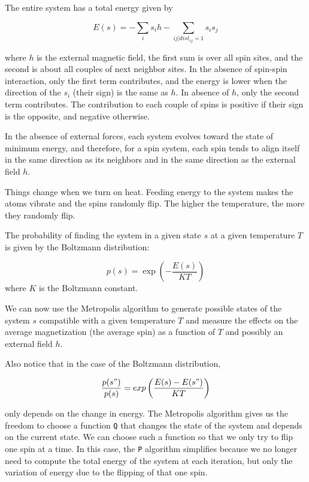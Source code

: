 \documentclass[justified, sixbynine]{tufte-book}
\def\ft{\small\tt}
\theoremstyle{plain}%
\newtheorem * {corollary}{Corollary}
\theoremstyle{definition}
\theoremstyle{remark}
\newtheorem * {remark}{Remark}
\newtheorem * {note}{Note}
\begin{document}
\begin{fullwidth}
The entire system has a total energy given by

\begin{equation}
E(s) = - \sum_i s_i h - \sum_{ij|dist_{ij}=1} s_i s_j
\end{equation}

where $h$ is the external magnetic field, the first sum is over all spin sites, and the second is about all couples of next neighbor sites. In the absence of spin-spin interaction, only the first term contributes, and the energy is lower when the direction of the $s_i$ (their sign) is the same as $h$. In absence of $h$, only the second term contributes. The contribution to each couple of spins is positive if their sign is the opposite, and negative otherwise.

In the absence of external forces, each system evolves toward the state of minimum energy, and therefore, for a spin system, each spin tends to align itself in the same direction as its neighbors and in the same direction as the external field $h$.

Things change when we turn on heat. Feeding energy to the system makes the atoms vibrate and the spins randomly flip. The higher the temperature, the more they randomly flip.

The probability of finding the system in a given state $s$ at a given temperature $T$ is given by the Boltzmann distribution:

\begin{equation}
p(s) = \exp\left(-\frac{E(s)}{KT}\right)
\end{equation}
where $K$ is the Boltzmann constant.

We can now use the Metropolis algorithm to generate possible states of the system $s$ compatible with a given temperature $T$ and measure the effects on the average magnetization (the average spin) as a function of $T$ and possibly an external field $h$.

Also notice that in the case of the Boltzmann distribution, 

\begin{equation}
\frac{p(s")}{p(s)} = exp\left(\frac{E(s)-E(s")}{KT}\right)
\end{equation}

only depends on the change in energy. The Metropolis algorithm gives us the freedom to choose a function {\ft Q} that changes the state of the system and depends on the current state. We can choose such a function so that we only try to flip one spin at a time. In this case, the {\ft P} algorithm simplifies because we no longer need to compute the total energy of the system at each iteration, but only the variation of energy due to the flipping of that one spin.


\end{fullwidth}
\end{document}
